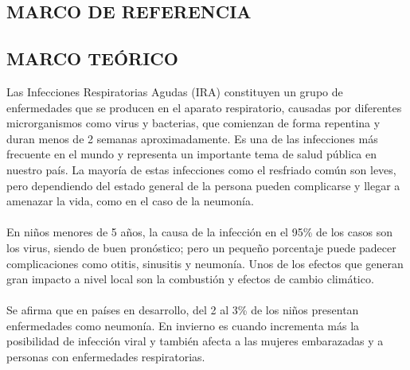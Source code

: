 \documentclass[a4paper,openright,12pt]{book}
\theoremstyle{definition}
\theoremstyle{remark}
\begin{document}
\begin{center}
 \chapter{MARCO DE REFERENCIA}\label{cap.referencia}
\end{center}

\section{MARCO TEÓRICO}
Las Infecciones Respiratorias Agudas (IRA) constituyen un grupo de enfermedades que se producen en el aparato respiratorio, causadas por diferentes microrganismos como virus y bacterias, que comienzan de forma repentina y duran menos de 2 semanas aproximadamente. Es una de las infecciones más frecuente en el mundo y representa un importante tema de salud pública en nuestro país.  La mayoría de estas infecciones como el resfriado común son leves, pero dependiendo del estado general de la persona pueden complicarse y llegar a amenazar la vida, como en el caso de la neumonía.\\\\
En niños menores de 5 años, la causa de la infección en el  95\% de los casos son los virus, siendo de buen pronóstico; pero un pequeño porcentaje puede padecer complicaciones como  otitis, sinusitis y neumonía. Unos de los efectos que generan gran impacto a nivel local son  la combustión y efectos de cambio climático.\\\\
Se afirma que en países en desarrollo, del 2 al 3\% de los niños presentan enfermedades como neumonía. En invierno es cuando incrementa más la posibilidad de infección viral y también afecta a las mujeres embarazadas y a personas con enfermedades respiratorias.\\\\
\end{document}
